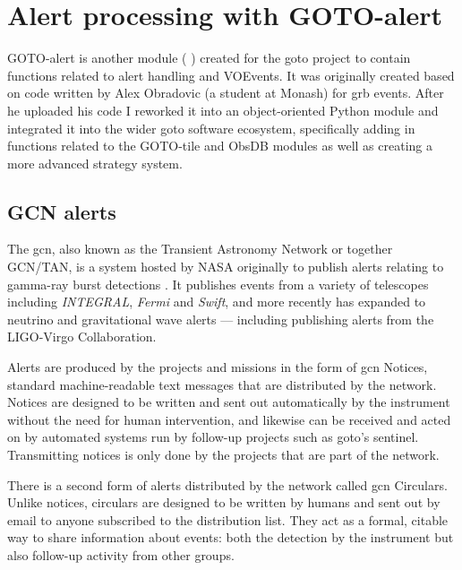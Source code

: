 \section{Alert processing with GOTO-alert}
\label{sec:gotoalert}
\begin{colsection}


\begin{colsection}

GOTO-alert is another  module ( ) created for the \gls{goto} project to contain functions related to alert handling and VOEvents. It was originally created based on code written by Alex Obradovic (a student at Monash) for \gls{grb} events. After he uploaded his code I reworked it into an object-oriented Python module and integrated it into the wider \gls{goto} software ecosystem, specifically adding in functions related to the GOTO-tile and ObsDB modules as well as creating a more advanced strategy system.

\end{colsection}


\subsection{GCN alerts}
\label{sec:gcn}
\begin{colsection}

The \gls{gcn}, also known as the Transient Astronomy Network or together GCN/TAN, is a system hosted by NASA originally to publish alerts relating to gamma-ray burst detections \citep{GCN}. It publishes events from a variety of telescopes including \textit{INTEGRAL}, \textit{Fermi} and \textit{Swift}, and more recently has expanded to neutrino and gravitational wave alerts --- including publishing alerts from the LIGO-Virgo Collaboration.

Alerts are produced by the projects and missions in the form of \gls{gcn} Notices, standard machine-readable text messages that are distributed by the network. Notices are designed to be written and sent out automatically by the instrument without the need for human intervention, and likewise can be received and acted on by automated systems run by follow-up projects such as \gls{goto}'s sentinel. Transmitting notices is only done by the projects that are part of the network.

There is a second form of alerts distributed by the network called \gls{gcn} Circulars. Unlike notices, circulars are designed to be written by humans and sent out by email to anyone subscribed to the distribution list. They act as a formal, citable way to share information about events: both the detection by the instrument but also follow-up activity from other groups.


\end{colsection}
\end{colsection}
